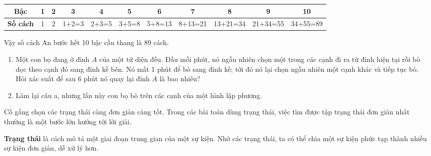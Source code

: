 \documentclass[12pt, a4paper]{article}
\begin{document}
		\begin{center}
			\renewcommand{\arraystretch}{1.5}
			\begin{tabular}{|c|c|c|c|c|c|c|c|c|c|c|}
				\hline
				\textbf{Bậc} & 1 & 2 & 3 & 4 & 5 & 6 & 7 & 8 & 9 & 10 \\
				\hline
				\textbf{Số cách} & 1 & 2 & 1+2=3 & 2+3=5 & 3+5=8 & 5+8=13 & 8+13=21 & 13+21=34 & 21+34=55 & 34+55=89 \\
				\hline
			\end{tabular}
		\end{center}
		
		\vspace{0.3cm}
		
		\noindent Vậy số cách An bước hết 10 bậc cầu thang là 89 cách.
			\vspace{0.3cm}
		
		
		\vspace{0.2cm}
		
		
		\begin{enumerate}[label=\alph*)]
			\item Một con bọ đang ở đỉnh \(A\) của một tứ diện đều. Đầu mỗi phút, nó ngẫu nhiên chọn một trong các cạnh đi ra từ đỉnh hiện tại rồi bò dọc theo cạnh đó sang đỉnh kề bên. Nó mất 1 phút để bò sang đỉnh kế; tới đó nó lại chọn ngẫu nhiên một cạnh khác và tiếp tục bò. Hỏi xác suất để sau 6 phút nó quay lại đỉnh \(A\) là bao nhiêu?
			\item Làm lại câu a, nhưng lần này con bọ bò trên các cạnh của một hình lập phương.
		\end{enumerate}
		
		\vspace{0.3cm}
		
		
		\noindent Cố gắng chọn các trạng thái càng đơn giản càng tốt. Trong các bài toán dùng trạng thái, việc tìm được tập trạng thái đơn giản nhất thường là một bước lớn hướng tới lời giải.
	
		\vspace{0.3cm}
		
		\noindent \textbf{Trạng thái} là cách mô tả một giai đoạn trung gian của một sự kiện. Nhờ các trạng thái, ta có thể chia một sự kiện phức tạp thành nhiều sự kiện đơn giản, dễ xử lý hơn.
		
\end{document}
